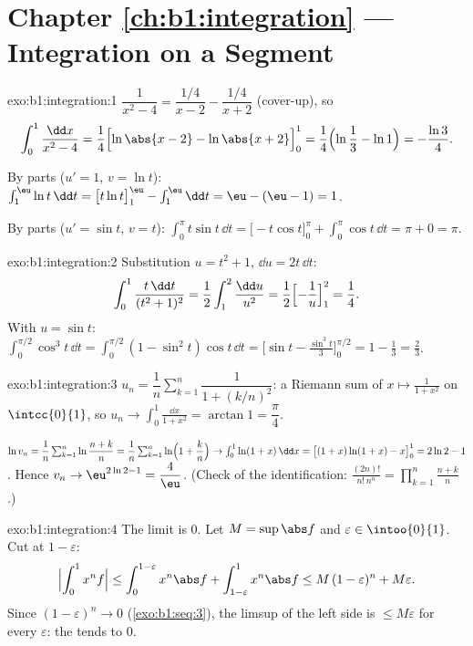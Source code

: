 \section*{Chapter \ref{ch:b1:integration} --- Integration on a Segment}

\begin{solution}{exo:b1:integration:1}
$\dfrac{1}{x^2-4} = \dfrac{1/4}{x - 2} - \dfrac{1/4}{x+2}$
(cover-up), so
\[
\int_0^1 \frac{\dd x}{x^2 - 4}
= \frac14\Bigl[\ln\abs{x-2} - \ln\abs{x+2}\Bigr]_0^1
= \frac14\Bigl(\ln\frac{1}{3} - \ln 1\Bigr) = -\frac{\ln 3}{4}.
\]

By parts ($u' = 1$, $v = \ln t$): $\int_1^{\eu} \ln t\,\dd t =
\bigl[t\ln t\bigr]_1^{\eu} - \int_1^{\eu} \dd t = \eu - (\eu - 1) =
1$.

By parts ($u' = \sin t$, $v = t$): $\int_0^\pi t\sin t\,\dd t =
\bigl[-t\cos t\bigr]_0^\pi + \int_0^\pi \cos t\,\dd t = \pi + 0 =
\pi$.
\end{solution}

\begin{solution}{exo:b1:integration:2}
Substitution $u = t^2 + 1$, $\dd u = 2t\,\dd t$:
\[
\int_0^1 \frac{t\,\dd t}{(t^2+1)^2}
= \frac12 \int_1^2 \frac{\dd u}{u^2}
= \frac12\Bigl[-\frac1u\Bigr]_1^2 = \frac14 .
\]
With $u = \sin t$: $\int_0^{\pi/2} \cos^3 t\,\dd t = \int_0^{\pi/2}
(1 - \sin^2 t)\cos t\,\dd t = \bigl[\sin t - \frac{\sin^3
t}{3}\bigr]_0^{\pi/2} = 1 - \frac13 = \frac23$.
\end{solution}

\begin{solution}{exo:b1:integration:3}
$u_n = \dfrac1n \sum_{k=1}^{n} \dfrac{1}{1 + (k/n)^2}$: a Riemann sum
of $x \mapsto \frac{1}{1+x^2}$ on $\intcc{0}{1}$, so $u_n \to
\int_0^1 \frac{\dd x}{1+x^2} = \arctan 1 = \dfrac\pi4$.

$\ln v_n = \dfrac1n \sum_{k=1}^{n} \ln\dfrac{n+k}{n} = \dfrac 1n
\sum_{k=1}^n \ln\Bigl(1 + \dfrac kn\Bigr) \to \int_0^1 \ln(1+x)\,\dd
x = \bigl[(1+x)\ln(1+x) - x\bigr]_0^1 = 2\ln 2 - 1$. Hence $v_n \to
\eu^{2\ln 2 - 1} = \dfrac 4\eu$. (Check of the identification:
$\frac{(2n)!}{n!\,n^n} = \prod_{k=1}^{n} \frac{n+k}{n}$.)
\end{solution}

\begin{solution}{exo:b1:integration:4}
The limit is $0$. Let $M = \sup \abs f$ and $\varepsilon \in
\intoo{0}{1}$. Cut at $1 - \varepsilon$:
\[
\Bigl| \int_0^1 x^n f \Bigr|
\leq \int_0^{1 - \varepsilon} x^n \abs f + \int_{1-\varepsilon}^1
x^n \abs f
\leq M\,(1-\varepsilon)^n + M\varepsilon .
\]
Since $(1 - \varepsilon)^n \to 0$ (\cref{exo:b1:seq:3}), the limsup
of the left side is $\leq M\varepsilon$ for every $\varepsilon$:
the  tends to $0$.
\end{solution}

